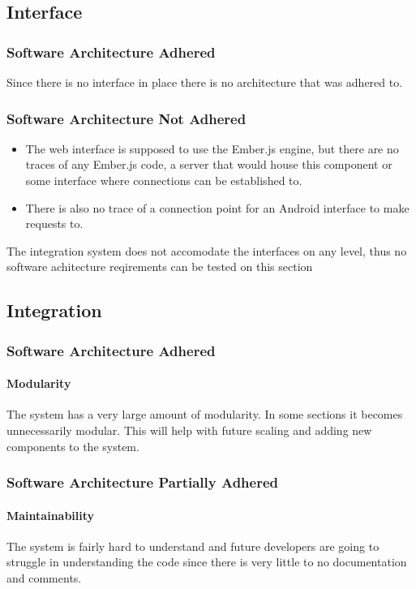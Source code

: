 \documentclass{article}
\begin{document}
	\subsection{Interface}
		\subsubsection{Software Architecture Adhered}
			Since there is no interface in place there is no architecture that was adhered to.
		\subsubsection{Software Architecture Not Adhered}
			\begin{itemize}	
				\item The web interface is supposed to use the Ember.js engine, but there are no traces of any Ember.js code, a server that would house this component or some interface where connections can be established to.
				\item There is also no trace of a connection point for an Android interface to make requests to.
			\end{itemize}
			The integration system does not accomodate the interfaces on any level, thus no software achitecture reqirements can be tested on this section

	\subsection{Integration}
		\subsubsection{Software Architecture Adhered}
			\paragraph{Modularity} The system has a very large amount of modularity. In some sections it becomes unnecessarily modular. This will help with future scaling and adding new components to the system.
			
		\subsubsection{Software Architecture Partially Adhered}
			\paragraph{Maintainability} The system is fairly hard to understand and future developers are going to struggle in understanding the code since there is very little to no documentation and comments.
\end{document}
